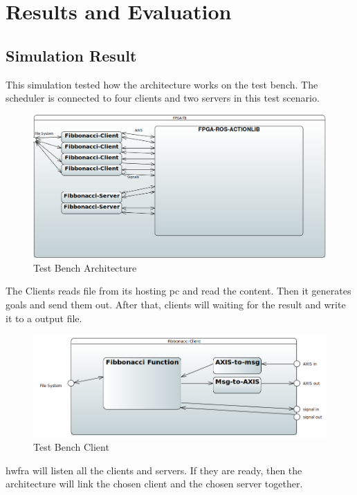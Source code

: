 \chapter{Results and Evaluation}
\label{sec:results_and_evaluation}

\section{Simulation Result}

This simulation tested how the architecture works on the  test bench. The scheduler is connected to four clients and two servers in this test scenario. 


\begin{figure}[htb]
	\centering
	\includegraphics[width=.9\linewidth]{figures/fpga-tb2.png}
	\caption{Test Bench Architecture}
	\label{fig:hwfra-tbio}
\end{figure}

The Clients reads file from its hosting pc and read the content. Then it generates goals and send them out. After that, clients will waiting for the result and write it to a output file.

\begin{figure}[htb]
	\centering
	\includegraphics[width=.9\linewidth]{figures/fp-cli.png}
	\caption{Test Bench Client}
	\label{fig:client-general}
\end{figure}

\gls{hwfra} will listen all the clients and servers. If they are ready, then the architecture will link the chosen client and the chosen server together. 


